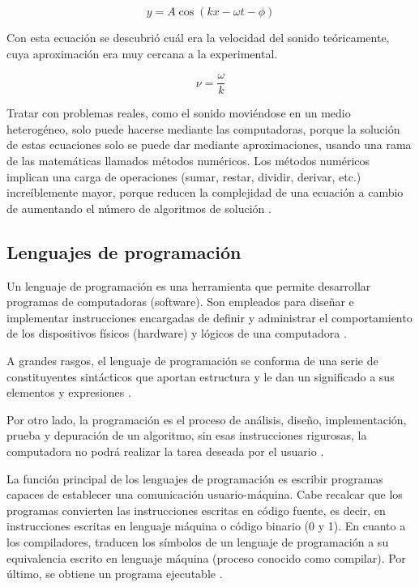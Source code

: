 \documentclass[11pt, letterpaper, spanish]{article}
\begin{document}
{\begin{equation*}
    y= A \cos{ \left( k x - \omega t - \phi \right) }
\end{equation*}

\par{Con esta ecuación se descubrió cuál era la velocidad del sonido teóricamente, cuya aproximación era muy cercana a la experimental.}

\begin{equation*}
    \nu = \frac{ \omega }{ k }
\end{equation*}

\par{Tratar con problemas reales, como el sonido moviéndose en un medio heterogéneo, solo puede hacerse mediante las computadoras, porque la solución de estas ecuaciones solo se puede dar mediante aproximaciones, usando una rama de las matemáticas llamados métodos numéricos. Los métodos numéricos implican una carga de operaciones (sumar, restar, dividir, derivar, etc.) increíblemente mayor, porque reducen la complejidad de una ecuación a cambio de aumentando el número de algoritmos de solución \cite{garfinkel_shevtsov_guo_2017}.}



    \subsection{Lenguajes de programación}
    
    \par{Un lenguaje de programación es una herramienta que permite desarrollar programas de computadoras (software). Son empleados para diseñar e implementar instrucciones encargadas de definir y administrar el comportamiento de los dispositivos físicos (hardware) y lógicos de una computadora  \cite{monterde_2020}.} 
    
     \par{A grandes rasgos, el lenguaje de programación se conforma de una serie de constituyentes sintácticos que aportan estructura y le dan un significado a sus elementos y expresiones \cite{garfinkel_shevtsov_guo_2017}.}
     
     \par{Por otro lado, la programación es el proceso de análisis, diseño, implementación, prueba y depuración de un algoritmo, sin esas instrucciones rigurosas, la computadora no podrá realizar la tarea deseada por el usuario \cite{garfinkel_shevtsov_guo_2017}.} 

    \par{La función principal de los lenguajes de programación es escribir programas capaces de establecer una comunicación usuario-máquina. Cabe recalcar que los programas convierten las instrucciones escritas en código fuente, es decir, en instrucciones escritas en lenguaje máquina o código binario (0 y 1). En cuanto a los compiladores, traducen los símbolos de un lenguaje de programación a su equivalencia escrito en lenguaje máquina (proceso conocido como compilar). Por último, se obtiene un programa ejecutable \cite{garfinkel_shevtsov_guo_2017}.}
   
}
\end{document}
